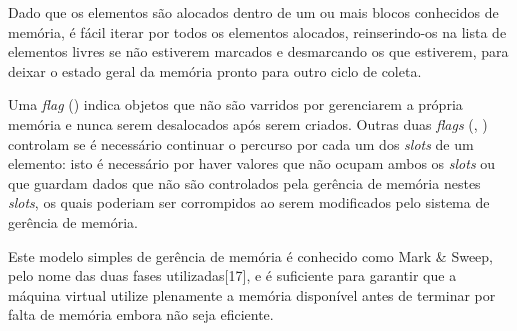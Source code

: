 Dado que os elementos são alocados dentro de um ou mais blocos conhecidos de
memória, é fácil iterar por todos os elementos alocados, reinserindo-os na
lista de elementos livres se não estiverem marcados e desmarcando os que
estiverem, para deixar o estado geral da memória pronto para outro ciclo de
coleta.

Uma \textit{flag} () indica objetos
que não são varridos por gerenciarem a própria memória e nunca serem
desalocados após serem criados. Outras duas \textit{flags}
(, ) controlam se é
necessário continuar o percurso por cada um dos \textit{slots} de um elemento:
isto é necessário por haver valores que não ocupam ambos os
\textit{slots} ou que guardam dados que não são controlados
pela gerência de memória nestes \textit{slots}, os quais poderiam ser
corrompidos ao serem modificados pelo sistema de gerência de memória.

Este modelo simples de gerência de memória é conhecido como Mark \& Sweep, pelo
nome das duas fases utilizadas[17], e é suficiente para garantir que a máquina
virtual utilize plenamente a memória disponível antes de terminar por falta de
memória embora não seja eficiente.

